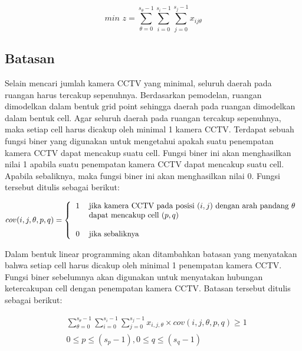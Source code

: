 \begin{equation*}
	\textit{min }z = \sum_{\theta=0}^{s_{\theta}-1} \sum_{i=0}^{s_i-1} \sum_{j=0}^{s_j-1} x_{ij\theta}
\end{equation*}

\subsection{Batasan}
Selain mencari jumlah kamera CCTV yang minimal, seluruh daerah pada ruangan harus tercakup sepenuhnya. Berdasarkan pemodelan, ruangan dimodelkan dalam bentuk grid point sehingga daerah pada ruangan dimodelkan dalam bentuk cell. Agar seluruh daerah pada ruangan tercakup sepenuhnya, maka setiap cell harus dicakup oleh minimal 1 kamera CCTV. Terdapat sebuah fungsi biner yang digunakan untuk mengetahui apakah suatu penempatan kamera CCTV dapat mencakup suatu cell. Fungsi biner ini akan menghasilkan nilai 1 apabila suatu penempatan kamera CCTV dapat mencakup suatu cell. Apabila sebaliknya, maka fungsi biner ini akan menghasilkan nilai 0. Fungsi tersebut ditulis sebagai berikut:

\begin{equation*}
	cov(i,j,\theta,p,q) =
	\left \{
		\begin{tabular}{cl}
			1 & jika kamera CCTV pada posisi $(i,j)$ dengan arah pandang $\theta$\\
  			  & dapat mencakup cell $(p,q)$\\
  			  & \\
  			0 & jika sebaliknya
		\end{tabular}
	\right.
\end{equation*}

Dalam bentuk linear programming akan ditambahkan batasan yang menyatakan bahwa setiap cell harus dicakup oleh minimal 1 penempatan kamera CCTV. Fungsi biner sebelumnya akan digunakan untuk menyatakan hubungan ketercakupan cell dengan penempatan kamera CCTV. Batasan tersebut ditulis sebagai berikut:

\begin{equation*}
	\begin{split}
		& \sum_{\theta=0}^{s_{\theta}-1} \sum_{i=0}^{s_i-1} \sum_{j=0}^{s_j-1} x_{i,j,\theta} \times cov(i,j,\theta,p,q) \geq 1\\
		& 0 \leq p \leq (s_p - 1), 0 \leq q \leq (s_q - 1)
	\end{split}
\end{equation*}

